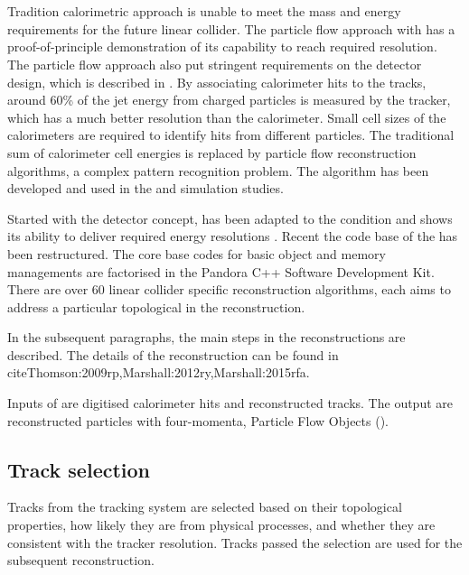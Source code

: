 \section{\pandora}
\label{sec:pandoraPandoraPFA}
Tradition calorimetric approach is unable to meet the mass and energy requirements for the future linear collider. The particle flow approach with \pandora has a proof-of-principle demonstration of its capability to reach required resolution. The particle flow approach also put stringent requirements on the detector design, which is described in . By associating calorimeter hits to the tracks, around 60\% of the jet energy from charged particles is measured by the tracker, which has a much better resolution than the calorimeter. Small cell sizes of the calorimeters are required to identify hits from different particles. The traditional sum of calorimeter cell energies is replaced by particle flow reconstruction algorithms, a complex pattern recognition problem.  The \pandora algorithm has been developed and used in the \ILC and \CLIC simulation studies.

Started with the \ILD detector concept, \pandora has been adapted to the \CLIC condition and shows its ability to deliver required energy resolutions \cite{Linssen:2012hp}. Recent the code base of the \pandora has been restructured. The core base codes for basic object and memory managements are factorised in the Pandora C++ Software Development Kit\cite{Marshall:2015rfa}. There are over 60 linear collider specific reconstruction algorithms, each aims to address a particular topological in the reconstruction.

In the subsequent paragraphs, the main steps in the \pandora reconstructions are described. The details of the reconstruction can be found in cite{Thomson:2009rp,Marshall:2012ry,Marshall:2015rfa}.

Inputs of \pandora are digitised calorimeter hits and reconstructed tracks. The output are reconstructed particles with four-momenta, Particle Flow Objects (\PFOs).

\subsection{Track selection}

Tracks from the tracking system are selected based on their topological properties, how likely they are from physical processes, and whether they are consistent with the tracker resolution. Tracks passed the selection are used for the subsequent reconstruction.

